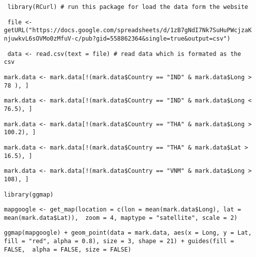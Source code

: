 \verb| library(RCurl) # run this package for load the data form the website |

\verb| file <- getURL("https://docs.google.com/spreadsheets/d/1zB7gNdI7Nk7SuHuPWcjzaKnjuwkvL6sOVMo0zMfuV-c/pub?gid=558862364&single=true&output=csv")|

\verb| data <- read.csv(text = file) # read data which is formated as the csv |

\verb|mark.data <- mark.data[!(mark.data$Country == "IND" & mark.data$Long > 78 ), ] |

\verb|mark.data <- mark.data[!(mark.data$Country == "IND" & mark.data$Long < 76.5), ] |

\verb|mark.data <- mark.data[!(mark.data$Country == "THA" & mark.data$Long > 100.2), ] |

\verb|mark.data <- mark.data[!(mark.data$Country == "THA" & mark.data$Lat > 16.5), ] |

\verb|mark.data <- mark.data[!(mark.data$Country == "VNM" & mark.data$Long > 108), ] |

\verb|library(ggmap)|

\verb|mapgoogle <- get_map(location = c(lon = mean(mark.data$Long), lat = mean(mark.data$Lat)),  zoom = 4, maptype = "satellite", scale = 2) |

\verb|ggmap(mapgoogle) + geom_point(data = mark.data, aes(x = Long, y = Lat, fill = "red", alpha = 0.8), size = 3, shape = 21) + guides(fill = FALSE,  alpha = FALSE, size = FALSE) |